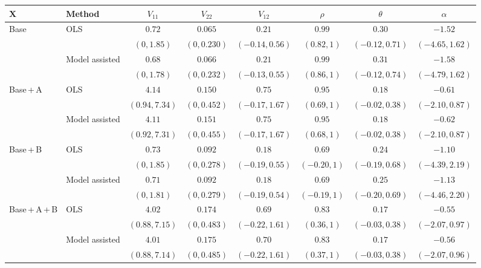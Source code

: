 \begin{tabular}{@{}llcccccc@{}}
\toprule
\(\bm X\) & Method & \(V_{11}\) & \(V_{22}\) & \(V_{12}\) & \(\rho\) & \(\theta\) & \(\alpha\)\\
\midrule
Base & OLS & $0.72$ & $0.065$ & $0.21$ & $0.99$ & $0.30$ & $-1.52$ \\
 &  & $(0, 1.85)$ & $(0, 0.230)$ & $(-0.14, 0.56)$ & $(0.82, 1)$ & $(-0.12, 0.71)$ & $(-4.65, 1.62)$ \\
 & Model assisted & $0.68$ & $0.066$ & $0.21$ & $0.99$ & $0.31$ & $-1.58$ \\
 &  & $(0, 1.78)$ & $(0, 0.232)$ & $(-0.13, 0.55)$ & $(0.86, 1)$ & $(-0.12, 0.74)$ & $(-4.79, 1.62)$ \\
\addlinespace
Base\,+\,A & OLS & $4.14$ & $0.150$ & $0.75$ & $0.95$ & $0.18$ & $-0.61$ \\
 &  & $(0.94, 7.34)$ & $(0, 0.452)$ & $(-0.17, 1.67)$ & $(0.69, 1)$ & $(-0.02, 0.38)$ & $(-2.10, 0.87)$ \\
 & Model assisted & $4.11$ & $0.151$ & $0.75$ & $0.95$ & $0.18$ & $-0.62$ \\
 &  & $(0.92, 7.31)$ & $(0, 0.455)$ & $(-0.17, 1.67)$ & $(0.68, 1)$ & $(-0.02, 0.38)$ & $(-2.10, 0.87)$ \\
\addlinespace
Base\,+\,B & OLS & $0.73$ & $0.092$ & $0.18$ & $0.69$ & $0.24$ & $-1.10$ \\
 &  & $(0, 1.85)$ & $(0, 0.278)$ & $(-0.19, 0.55)$ & $(-0.20, 1)$ & $(-0.19, 0.68)$ & $(-4.39, 2.19)$ \\
 & Model assisted & $0.71$ & $0.092$ & $0.18$ & $0.69$ & $0.25$ & $-1.13$ \\
 &  & $(0, 1.81)$ & $(0, 0.279)$ & $(-0.19, 0.54)$ & $(-0.19, 1)$ & $(-0.20, 0.69)$ & $(-4.46, 2.20)$ \\
\addlinespace
Base\,+\,A\,+\,B & OLS & $4.02$ & $0.174$ & $0.69$ & $0.83$ & $0.17$ & $-0.55$ \\
 &  & $(0.88, 7.15)$ & $(0, 0.483)$ & $(-0.22, 1.61)$ & $(0.36, 1)$ & $(-0.03, 0.38)$ & $(-2.07, 0.97)$ \\
 & Model assisted & $4.01$ & $0.175$ & $0.70$ & $0.83$ & $0.17$ & $-0.56$ \\
 &  & $(0.88, 7.14)$ & $(0, 0.485)$ & $(-0.22, 1.61)$ & $(0.37, 1)$ & $(-0.03, 0.38)$ & $(-2.07, 0.96)$ \\
\bottomrule
\end{tabular}
